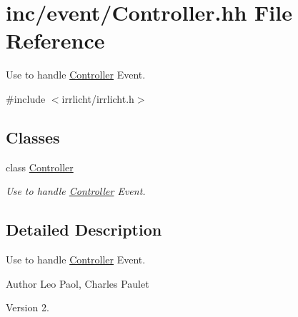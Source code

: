 \hypertarget{Controller_8hh}{}\section{inc/event/\+Controller.hh File Reference}
\label{Controller_8hh}


Use to handle \hyperlink{classController}{Controller} Event.  


{\ttfamily \#include $<$irrlicht/irrlicht.\+h$>$}\newline
\subsection*{Classes}
\begin{DoxyCompactItemize}
\item 
class \hyperlink{classController}{Controller}
\begin{DoxyCompactList}\small\item\em Use to handle \hyperlink{classController}{Controller} Event. \end{DoxyCompactList}\end{DoxyCompactItemize}


\subsection{Detailed Description}
Use to handle \hyperlink{classController}{Controller} Event. 

\begin{DoxyAuthor}{Author}
Leo Paol, Charles Paulet 
\end{DoxyAuthor}
\begin{DoxyVersion}{Version}
2. 
\end{DoxyVersion}
